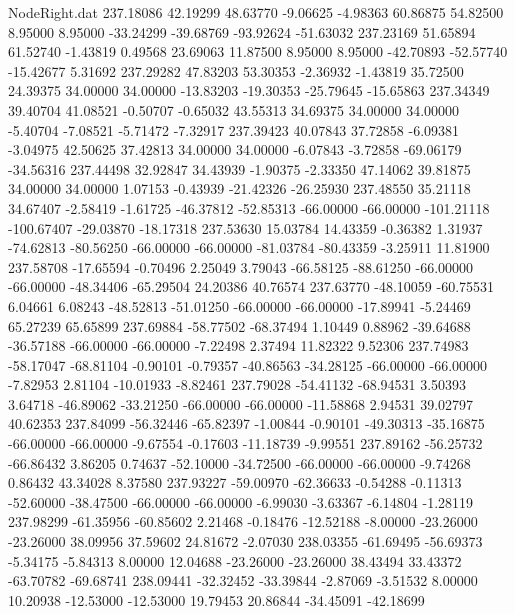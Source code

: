 \begin{filecontents}{NodeRight.dat}
 237.18086   42.19299   48.63770    -9.06625   -4.98363   60.86875   54.82500    8.95000    8.95000  -33.24299  -39.68769  -93.92624  -51.63032
 237.23169   51.65894   61.52740    -1.43819    0.49568   23.69063   11.87500    8.95000    8.95000  -42.70893  -52.57740  -15.42677    5.31692
 237.29282   47.83203   53.30353    -2.36932   -1.43819   35.72500   24.39375   34.00000   34.00000  -13.83203  -19.30353  -25.79645  -15.65863
 237.34349   39.40704   41.08521    -0.50707   -0.65032   43.55313   34.69375   34.00000   34.00000   -5.40704   -7.08521   -5.71472   -7.32917
 237.39423   40.07843   37.72858    -6.09381   -3.04975   42.50625   37.42813   34.00000   34.00000   -6.07843   -3.72858  -69.06179  -34.56316
 237.44498   32.92847   34.43939    -1.90375   -2.33350   47.14062   39.81875   34.00000   34.00000    1.07153   -0.43939  -21.42326  -26.25930
 237.48550   35.21118   34.67407    -2.58419   -1.61725  -46.37812  -52.85313  -66.00000  -66.00000 -101.21118 -100.67407  -29.03870  -18.17318
 237.53630   15.03784   14.43359    -0.36382    1.31937  -74.62813  -80.56250  -66.00000  -66.00000  -81.03784  -80.43359   -3.25911   11.81900
 237.58708  -17.65594   -0.70496     2.25049    3.79043  -66.58125  -88.61250  -66.00000  -66.00000  -48.34406  -65.29504   24.20386   40.76574
 237.63770  -48.10059  -60.75531     6.04661    6.08243  -48.52813  -51.01250  -66.00000  -66.00000  -17.89941   -5.24469   65.27239   65.65899
 237.69884  -58.77502  -68.37494     1.10449    0.88962  -39.64688  -36.57188  -66.00000  -66.00000   -7.22498    2.37494   11.82322    9.52306
 237.74983  -58.17047  -68.81104    -0.90101   -0.79357  -40.86563  -34.28125  -66.00000  -66.00000   -7.82953    2.81104  -10.01933   -8.82461
 237.79028  -54.41132  -68.94531     3.50393    3.64718  -46.89062  -33.21250  -66.00000  -66.00000  -11.58868    2.94531   39.02797   40.62353
 237.84099  -56.32446  -65.82397    -1.00844   -0.90101  -49.30313  -35.16875  -66.00000  -66.00000   -9.67554   -0.17603  -11.18739   -9.99551
 237.89162  -56.25732  -66.86432     3.86205    0.74637  -52.10000  -34.72500  -66.00000  -66.00000   -9.74268    0.86432   43.34028    8.37580
 237.93227  -59.00970  -62.36633    -0.54288   -0.11313  -52.60000  -38.47500  -66.00000  -66.00000   -6.99030   -3.63367   -6.14804   -1.28119
 237.98299  -61.35956  -60.85602     2.21468   -0.18476  -12.52188   -8.00000  -23.26000  -23.26000   38.09956   37.59602   24.81672   -2.07030
 238.03355  -61.69495  -56.69373    -5.34175   -5.84313    8.00000   12.04688  -23.26000  -23.26000   38.43494   33.43372  -63.70782  -69.68741
 238.09441  -32.32452  -33.39844    -2.87069   -3.51532    8.00000   10.20938  -12.53000  -12.53000   19.79453   20.86844  -34.45091  -42.18699

\end{filecontents}
